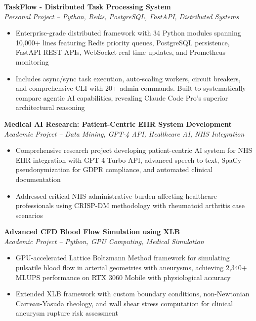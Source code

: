 \documentclass[a4paper,11pt]{article}
\begin{document}
\begin{itemize}[leftmargin=1em, itemsep=0.05em]
\textbf{TaskFlow - Distributed Task Processing System}\\
\textit{Personal Project -- Python, Redis, PostgreSQL, FastAPI, Distributed Systems}
\begin{itemize}[leftmargin=1em, itemsep=0.05em]
    \item Enterprise-grade distributed framework with 34 Python modules spanning 10,000+ lines featuring Redis priority queues, PostgreSQL persistence, FastAPI REST APIs, WebSocket real-time updates, and Prometheus monitoring
    \item Includes async/sync task execution, auto-scaling workers, circuit breakers, and comprehensive CLI with 20+ admin commands. Built to systematically compare agentic AI capabilities, revealing Claude Code Pro's superior architectural reasoning
\end{itemize}

\textbf{Medical AI Research: Patient-Centric EHR System Development}\\
\textit{Academic Project -- Data Mining, GPT-4 API, Healthcare AI, NHS Integration}
\begin{itemize}[leftmargin=1em, itemsep=0.05em]
    \item Comprehensive research project developing patient-centric AI system for NHS EHR integration with GPT-4 Turbo API, advanced speech-to-text, SpaCy pseudonymization for GDPR compliance, and automated clinical documentation
    \item Addressed critical NHS administrative burden affecting healthcare professionals using CRISP-DM methodology with rheumatoid arthritis case scenarios
\end{itemize}

\textbf{Advanced CFD Blood Flow Simulation using XLB}\\
\textit{Academic Project -- Python, GPU Computing, Medical Simulation}
\begin{itemize}[leftmargin=1em, itemsep=0.05em]
    \item GPU-accelerated Lattice Boltzmann Method framework for simulating pulsatile blood flow in arterial geometries with aneurysms, achieving 2,340+ MLUPS performance on RTX 3060 Mobile with physiological accuracy
    \item Extended XLB framework with custom boundary conditions, non-Newtonian Carreau-Yasuda rheology, and wall shear stress computation for clinical aneurysm rupture risk assessment
\end{itemize}


\end{itemize}
\end{document}
